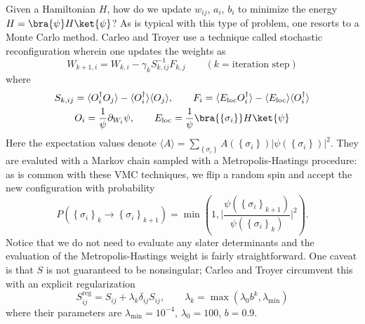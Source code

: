 \documentclass{report}
\begin{document}
Given a Hamiltonian $ H $, how do we update $ w_{ij} $, $ a_i $, $ b_i $
to minimize the energy $ H = \bra{\psi}H\ket{\psi} $? As is typical with 
this type of problem, one resorts to a Monte Carlo method. Carleo and Troyer 
use a technique called stochastic reconfiguration wherein one updates the 
weights as 
\begin{equation*}
	W_{k+1, i}= W_{k,i} - \gamma_k S^{-1}_{k, ij} F_{k, j}
	\qquad (k=\text{iteration step})
\end{equation*}
where 
\begin{gather*}
	S_{k,ij} = \langle O_i^\dagger O_j\rangle - \langle O_i^\dagger\rangle \langle O_j\rangle,\qquad 
	F_{i} = \langle E_{\text{loc}} O_i^\dagger\rangle - \langle E_{\text{loc}}\rangle
		\langle O_i^\dagger \rangle\\
	O_i = \frac{1}{\psi} \partial_{W_i} \psi,\qquad 
	E_{\text{loc}} = \frac{1}{\psi}\bra{\left\{\sigma_i\right\}} H \ket{\psi} 
\end{gather*}
Here the expectation values denote $ \langle A\rangle = \sum_{\left\{\sigma_i\right\}} 
A (\left\{\sigma_i\right\})|\psi(\left\{\sigma_i\right\})|^2 $. They are 
evaluted with a Markov chain sampled with a Metropolis-Hastings procedure:
as is common with these VMC techniques, we flip a random spin and accept the 
new configuration with probability 
\begin{equation*}
	P(\left\{\sigma_i\right\}_k \to \left\{\sigma_i\right\}_{k+1})
		= \min \left(1, \Bigg| \frac{
				\psi(\left\{\sigma_i\right\}_{k+1})
			}{
				\psi(\left\{\sigma_i\right\}_{k})}\Bigg|^2\right).
\end{equation*}
Notice that we do not need to evaluate any slater determinants and the
evaluation of the Metropolis-Hastings weight is fairly straightforward.
One caveat is that $ S $ is not guaranteed to be nonsingular; Carleo and Troyer 
circumvent this with an explicit regularization 
\begin{equation*}
	S_{ij}^{\text{reg}} = S_{ij} + \lambda_{k} \delta_{ij}S_{ij},\qquad 
	\lambda_{k} = \max (\lambda_0 b^k, \lambda_{\text{min}})
\end{equation*}
where their parameters are $ \lambda_{\text{min}} = 10^{-4}$, $ \lambda_0 = 100 $, 
$ b=0.9 $.
\end{document}
